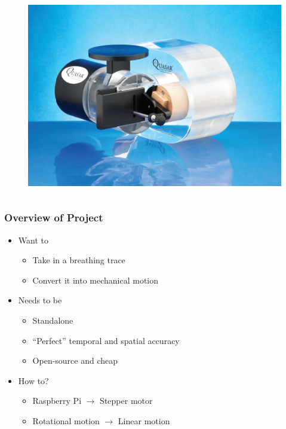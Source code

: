 \documentclass{beamer}
\begin{document}
\begin{frame}
\begin{columns}
\begin{column}{0.5\textwidth}
\begin{figure}[h]
            \end{figure}
            \vspace*{-2em}
            \begin{figure}[h]
                \centering
                \includegraphics[width=0.9\columnwidth]{QASAR.png}
            \end{figure}
        \end{column}
    \end{columns}

\end{frame}

\begin{frame}

    \frametitle{Overview of Project}

    \begin{itemize}
        \item Want to
            \begin{itemize}
                \item Take in a breathing trace
                \item Convert it into mechanical motion
            \end{itemize}
            \vspace{1em}
        \item Needs to be
            \begin{itemize}
                \item Standalone
                \item ``Perfect'' temporal and spatial accuracy
                \item Open-source and cheap
            \end{itemize}
            \vspace{1em}
        \item How to?
            \begin{itemize}
                \item Raspberry Pi $\rightarrow$ Stepper motor
                \item Rotational motion $\rightarrow$ Linear motion
            \end{itemize}
    \end{itemize}

\end{frame}
\end{document}
